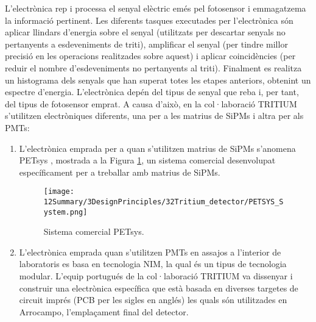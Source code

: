 L'electrònica rep i processa el senyal elèctric emés pel fotosensor i emmagatzema la informació pertinent. Les diferents tasques executades per l'electrònica són aplicar llindars d'energia sobre el senyal (utilitzats per descartar senyals no pertanyents a esdeveniments de triti), amplificar el senyal (per tindre millor precisió en les operacions realitzades sobre aquest) i aplicar coincidències (per reduir el nombre d'esdeveniments no pertanyents al triti). Finalment es realitza un histograma dels senyals que han superat totes les etapes anteriors, obtenint un espectre d'energia. L'electrònica depén del tipus de senyal que reba i, per tant, del tipus de fotosensor emprat. A causa d'això, en la col·laboració TRITIUM s'utilitzen electròniques diferents, una per a les matrius de SiPMs i altra per als PMTs:

\begin{enumerate}

\item{} L'electrònica emprada per a quan s'utilitzen matrius de SiPMs s'anomena PETsys \cite{PETSYS}, mostrada a la Figura \ref{fig:PETSYSs}, un sistema comercial desenvolupat específicament per a treballar amb matrius de SiPMs. 

\begin{figure}[h]
\texttt{[image: 12Summary/3DesignPrinciples/32Tritium\_detector/PETSYS\_System.png]}
\centering
\caption{Sistema comercial PETsys\label{fig:PETSYSs}.}
\end{figure}

\item{} L'electrònica emprada quan s'utilitzen PMTs en assajos a l'interior de laboratoris es basa en tecnologia NIM, la qual és un tipus de tecnologia modular. L'equip portugués de la col·laboració TRITIUM va dissenyar i construir una electrònica específica que està basada en diverses targetes de circuit imprés (PCB per les sigles en anglés) les quals són utilitzades en Arrocampo, l'emplaçament final del detector.

\end{enumerate}